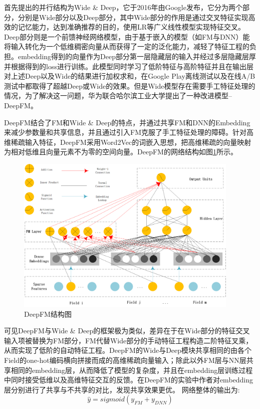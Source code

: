 首先提出的并行结构为Wide \& Deep，它于2016年由Google发布，它分为两个部分，分别是Wide部分以及Deep部分，其中Wide部分的作用是通过交叉特征实现高效的记忆能力，达到准确推荐的目的，使用LR等广义线性模型实现特征交叉。Deep部分则是一个前馈神经网络模型，由于基于嵌入的模型（如FM与DNN）能将输入转化为一个低维稠密向量从而获得了一定的泛化能力，减轻了特征工程的负担。embedding得到的向量作为Deep部分第一层隐藏层的输入并经过多层隐藏层厚并根据得到的loss进行训练。此模型同时学习了低阶特征与高阶特征并且在输出层对上述Deep以及Wide的结果进行加权求和，在Google Play离线测试以及在线A/B测试中都取得了超越Deep或Wide的效果。但是Wide模型存在需要手工特征处理的情况，为了解决这一问题，华为联合哈尔滨工业大学提出了一种改进模型--DeepFM\cite{guo2017deepfm}。

DeepFM结合了FM和Wide \& Deep的特点，并通过共享FM和DNN的Embedding来减少参数量和共享信息，并且通过引入FM克服了手工特征处理的障碍。针对高维稀疏输入特征，DeepFM采用Word2Vec的词嵌入思想，把高维稀疏的向量映射为相对低维且向量元素不为零的空间向量。DeepFM的网络结构如图\ref{DeepFM结构}所示。
\begin{figure}[htb]
  \vspace{13pt} %
  \centering
  \includegraphics[width=0.95\textwidth]{images/DeepFM.png}
  \caption{DeepFM结构图\cite{DeepFM结构图}}\label{DeepFM结构} %
\end{figure}

可见DeepFM与Wide \& Deep的框架极为类似，差异在于在Wide部分的特征交叉输入项被替换为FM部分，FM代替Wide部分的手动特征工程构造二阶特征叉乘，从而实现了低阶的自动特征工程。DeepFM的Wide与Deep模块共享相同的由各个Field的one-hot编码横向拼接而成的高维稀疏向量输入；除此以外FM层与NN层共享相同的embedding层，从而降低了模型的复杂度，并且在embedding层训练过程中同时接受低维以及高维特征交互的反馈。在DeepFM的实验中作者对embedding层分别进行了共享与不共享的对比，发现共享效果更优。
网络整体的输出为:
\begin{equation}
  \hat{y} = sigmoid(y_{FM} +y_{DNN})
\end{equation}

